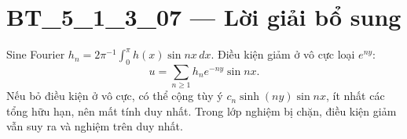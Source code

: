 \documentclass[10pt,a4paper]{article}
\begin{document}
\section*{BT\_5\_1\_3\_07 — Lời giải bổ sung}
Sine Fourier $h_n=2\pi^{-1}\int_0^\pi h(x)\sin nx\,dx$. Điều kiện giảm ở vô cực loại $e^{ny}$:
\[u=\sum_{n\ge1}h_ne^{-ny}\sin nx.\]
Nếu bỏ điều kiện ở vô cực, có thể cộng tùy ý $c_n\sinh(ny)\sin nx$, ít nhất các tổng hữu hạn, nên mất tính duy nhất. Trong lớp nghiệm bị chặn, điều kiện giảm vẫn suy ra và nghiệm trên duy nhất.
\end{document}
